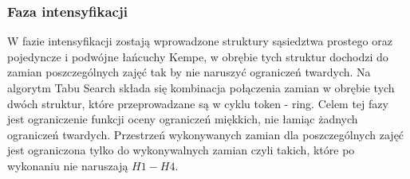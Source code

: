\documentclass[11pt]{report}
\begin{document}
\subsubsection{Faza intensyfikacji}
\par W fazie intensyfikacji zostają wprowadzone struktury sąsiedztwa prostego oraz pojedyncze i podwójne łańcuchy Kempe, w obrębie tych struktur dochodzi do zamian poszczególnych zajęć tak by nie naruszyć ograniczeń twardych. Na algorytm Tabu Search składa się kombinacja połączenia zamian w obrębie tych dwóch struktur, które przeprowadzane są w cyklu token - ring. Celem tej fazy jest ograniczenie funkcji oceny ograniczeń miękkich, nie łamiąc żadnych ograniczeń twardych. Przestrzeń wykonywanych zamian dla poszczególnych zajęć jest ograniczona tylko do wykonywalnych zamian czyli takich, które po wykonaniu nie naruszają ${H1-H4}$.
\end{document}
